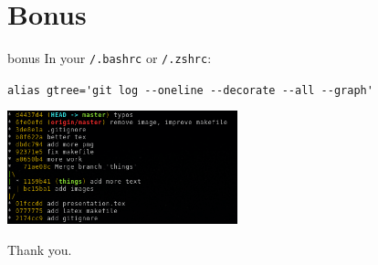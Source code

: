 \documentclass[usenames,dvipsnames,9pt]{beamer}
\newcommand{\textapprox}{\raisebox{0.5ex}{\texttildelow}}
\begin{document}
%
%
\section{Bonus}


\begin{frame}[fragile]{bonus}
  In your \;\texttt{\textapprox/.bashrc} or \;\texttt{\textapprox/.zshrc}:

  \lstinline|alias gtree='git log --oneline --decorate --all --graph'|

  \includegraphics[width=0.5\textwidth]{img/gtree.png}
\end{frame}


\begin{frame}[standout]
Thank you.
\end{frame}
\end{document}
